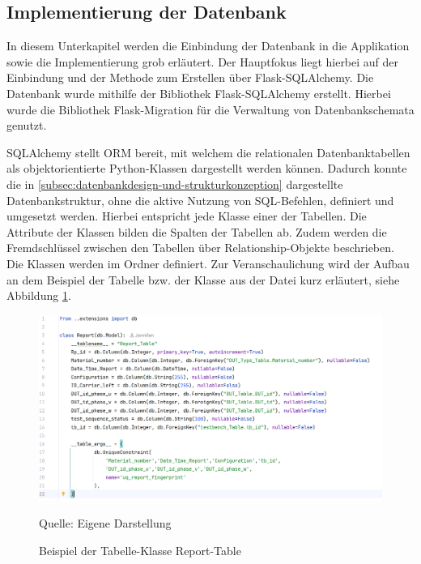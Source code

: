 \subsection{Implementierung der Datenbank}
\label{subsec:implementierung-der-datenbank}

In diesem Unterkapitel werden die Einbindung der Datenbank in die Applikation sowie die Implementierung grob erläutert.
Der Hauptfokus liegt hierbei auf der Einbindung und der Methode zum Erstellen über Flask-SQLAlchemy.
Die Datenbank wurde mithilfe der Bibliothek Flask-SQLAlchemy erstellt.
Hierbei wurde die Bibliothek Flask-Migration für die Verwaltung von Datenbankschemata genutzt.

SQLAlchemy stellt \ac{ORM} bereit, mit welchem die relationalen Datenbanktabellen als objektorientierte Python-Klassen dargestellt werden können.
Dadurch konnte die in \ref{subsec:datenbankdesign-und-strukturkonzeption} dargestellte Datenbankstruktur, ohne die aktive Nutzung von SQL-Befehlen, definiert und umgesetzt werden.
Hierbei entspricht jede Klasse einer der Tabellen.
Die Attribute der Klassen bilden die Spalten der Tabellen ab.
Zudem werden die Fremdschlüssel zwischen den Tabellen über Relationship-Objekte beschrieben.
Die Klassen werden im Ordner  definiert.
Zur Veranschaulichung wird der Aufbau an dem Beispiel der Tabelle bzw. der Klasse  aus der Datei  kurz erläutert, siehe Abbildung \ref{fig: Beispiel der Tabelle-Klasse Report-Table}.

\begin{figure}[H]
    \centering
    \includegraphics[width=1\textwidth]{Grafiken/5.4 Class.png}
    \caption{Beispiel der Tabelle-Klasse Report-Table}
    \label{fig: Beispiel der Tabelle-Klasse Report-Table}
    {Quelle: Eigene Darstellung}
\end{figure}



